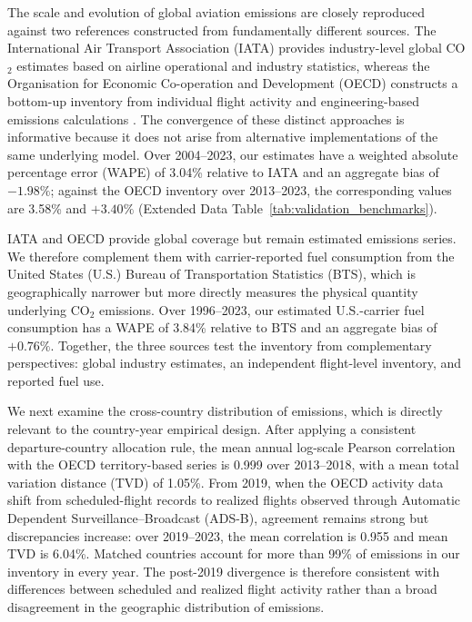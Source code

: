 \documentclass[12pt]{extarticle}
\begin{document}
The scale and evolution of global aviation emissions are closely reproduced against two references constructed from fundamentally different sources. The International Air Transport Association (IATA) provides industry-level global CO$_2$ estimates based on airline operational and industry statistics, whereas the Organisation for Economic Co-operation and Development (OECD) constructs a bottom-up inventory from individual flight activity and engineering-based emissions calculations \citep{iata2018,iata2019,iata2024,clarke2022}. The convergence of these distinct approaches is informative because it does not arise from alternative implementations of the same underlying model. Over 2004--2023, our estimates have a weighted absolute percentage error (WAPE) of 3.04\% relative to IATA and an aggregate bias of $-1.98\%$; against the OECD inventory over 2013--2023, the corresponding values are 3.58\% and $+3.40\%$ (Extended Data Table~\ref{tab:validation_benchmarks}).

IATA and OECD provide global coverage but remain estimated emissions series. We therefore complement them with carrier-reported fuel consumption from the United States (U.S.) Bureau of Transportation Statistics (BTS), which is geographically narrower but more directly measures the physical quantity underlying CO$_2$ emissions. Over 1996--2023, our estimated U.S.-carrier fuel consumption has a WAPE of 3.84\% relative to BTS and an aggregate bias of $+0.76\%$. Together, the three sources test the inventory from complementary perspectives: global industry estimates, an independent flight-level inventory, and reported fuel use.

We next examine the cross-country distribution of emissions, which is directly relevant to the country-year empirical design. After applying a consistent departure-country allocation rule, the mean annual log-scale Pearson correlation with the OECD territory-based series is 0.999 over 2013--2018, with a mean total variation distance (TVD) of 1.05\%. From 2019, when the OECD activity data shift from scheduled-flight records to realized flights observed through Automatic Dependent Surveillance--Broadcast (ADS-B), agreement remains strong but discrepancies increase: over 2019--2023, the mean correlation is 0.955 and mean TVD is 6.04\%. Matched countries account for more than 99\% of emissions in our inventory in every year. The post-2019 divergence is therefore consistent with differences between scheduled and realized flight activity rather than a broad disagreement in the geographic distribution of emissions.
\end{document}
